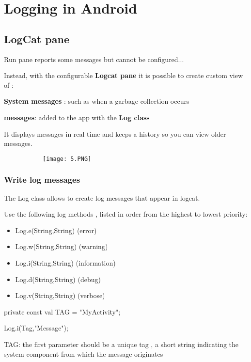 \documentclass{article}
\begin{document}
\section{Logging in Android}
\subsection{LogCat pane}

Run pane reports some messages but cannot be configured...

Instead, with the configurable \textbf{Logcat pane} it is possible to create custom view of :


\textbf{System messages} : such as when a garbage collection occurs

\textbf{messages}: added to the app with the \textbf{Log class}

It displays messages in real time and keeps a history so you can view older messages.

\begin{figure}[ht!]
  \centering
  \begin{subfigure}[b]{0.8\linewidth}
    \texttt{[image: 5.PNG]}
  \end{subfigure}
\end{figure}

\subsubsection{Write log messages}

The Log class allows to create log messages that appear in logcat.

Use the following log methods , listed in order from the highest to lowest priority:

\begin{itemize}
    \item  Log.e(String,String) (error)
    \item  Log.w(String,String) (warning)
    \item  Log.i(String,String) (information)
    \item  Log.d(String,String) (debug)
    \item  Log.v(String,String) (verbose)
    
\end{itemize}

private const val TAG = "MyActivity";

Log.i(Tag,"Message");

TAG: the first parameter should be a unique tag , a short string indicating the system component from which the message originates
\end{document}
